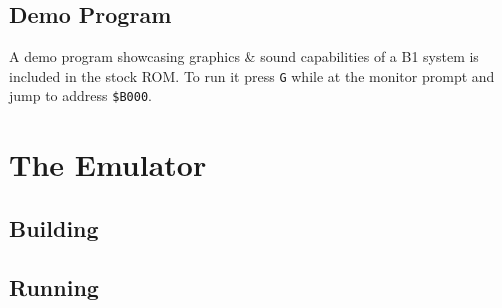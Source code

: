 \documentclass[a4paper,10pt,oneside]{article}
\begin{document}
\subsection{Demo Program}
A demo program showcasing graphics \& sound capabilities of a B1 system is included in the stock ROM. To run it press \texttt{G} while at the monitor prompt and jump to address \texttt{\$B000}.

\section{The Emulator}
\subsection{Building}
\subsection{Running}
\end{document}
